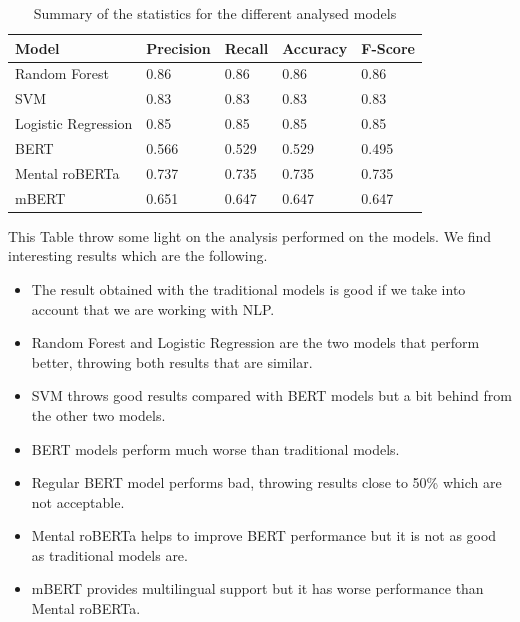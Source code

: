 \begin{table}[h]
\centering
\begin{tabular}{|l|l|l|l|l|}
\hline
\textbf{Model}      & \textbf{Precision} & \textbf{Recall} & \textbf{Accuracy} & \textbf{F-Score} \\ \hline
Random Forest       & 0.86               & 0.86            & 0.86              & 0.86             \\ \hline
SVM                 & 0.83               & 0.83            & 0.83              & 0.83             \\ \hline
Logistic Regression & 0.85               & 0.85            & 0.85              & 0.85             \\ \hline
BERT                & 0.566              & 0.529           & 0.529             & 0.495            \\ \hline
Mental roBERTa      & 0.737              & 0.735           & 0.735             & 0.735            \\ \hline
mBERT               & 0.651              & 0.647           & 0.647             & 0.647            \\ \hline
\end{tabular}
\caption{Summary of the statistics for the different analysed models}
\label{tab:summarystatistics}
\end{table}

This Table throw some light on the analysis performed on the models. We find interesting results which are the following.

\begin{itemize}
    \item The result obtained with the traditional models is good if we take into account that we are working with NLP.
    \item Random Forest and Logistic Regression are the two models that perform better, throwing both results that are similar.
    \item SVM throws good results compared with BERT models but a bit behind from the other two models.
    \item BERT models perform much worse than traditional models.
    \item Regular BERT model performs bad, throwing results close to 50\% which are not acceptable.
    \item Mental roBERTa helps to improve BERT performance but it is not as good as traditional models are.
    \item mBERT provides multilingual support but it has worse performance than Mental roBERTa.
\end{itemize}

